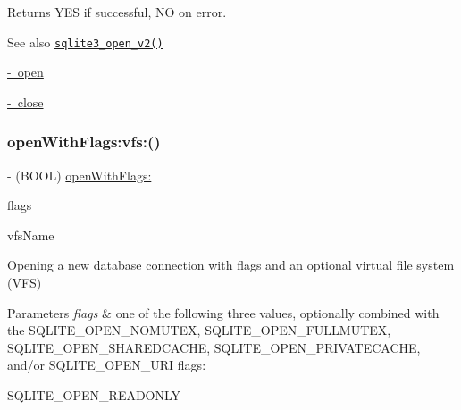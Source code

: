 \begin{DoxyReturn}{Returns}
{\ttfamily Y\+ES} if successful, {\ttfamily NO} on error.
\end{DoxyReturn}
\begin{DoxySeeAlso}{See also}
\href{http://sqlite.org/c3ref/open.html}{\tt sqlite3\+\_\+open\+\_\+v2()} 

\mbox{\hyperlink{interface_o_p_t_l_y_f_m_d_b_database_afc3b896f0808f555b09064bb6d514f93}{-\/ open}} 

\mbox{\hyperlink{interface_o_p_t_l_y_f_m_d_b_database_a6979a72ddb72bf8187a06607943bee98}{-\/ close}} 
\end{DoxySeeAlso}
\mbox{\label{interface_o_p_t_l_y_f_m_d_b_database_a5019a19308c2d2f53901bc15e18b2f31}} 
\subsubsection{\texorpdfstring{open\+With\+Flags\+:vfs\+:()}{openWithFlags:vfs:()}}
{\footnotesize\ttfamily -\/ (B\+O\+OL) \mbox{\hyperlink{interface_o_p_t_l_y_f_m_d_b_database_a088fc6d53b7e5b2713d5cacef74807ad}{open\+With\+Flags\+:}} \begin{DoxyParamCaption}\item[{(int)}]{flags }\item[{vfs:(N\+S\+String $\ast$\+\_\+\+Nullable)}]{vfs\+Name }\end{DoxyParamCaption}}

Opening a new database connection with flags and an optional virtual file system (V\+FS)


\begin{DoxyParams}{Parameters}
{\em flags} & one of the following three values, optionally combined with the {\ttfamily S\+Q\+L\+I\+T\+E\+\_\+\+O\+P\+E\+N\+\_\+\+N\+O\+M\+U\+T\+EX}, {\ttfamily S\+Q\+L\+I\+T\+E\+\_\+\+O\+P\+E\+N\+\_\+\+F\+U\+L\+L\+M\+U\+T\+EX}, {\ttfamily S\+Q\+L\+I\+T\+E\+\_\+\+O\+P\+E\+N\+\_\+\+S\+H\+A\+R\+E\+D\+C\+A\+C\+HE}, {\ttfamily S\+Q\+L\+I\+T\+E\+\_\+\+O\+P\+E\+N\+\_\+\+P\+R\+I\+V\+A\+T\+E\+C\+A\+C\+HE}, and/or {\ttfamily S\+Q\+L\+I\+T\+E\+\_\+\+O\+P\+E\+N\+\_\+\+U\+RI} flags\+:\\
\hline
\end{DoxyParams}
{\ttfamily S\+Q\+L\+I\+T\+E\+\_\+\+O\+P\+E\+N\+\_\+\+R\+E\+A\+D\+O\+N\+LY}

